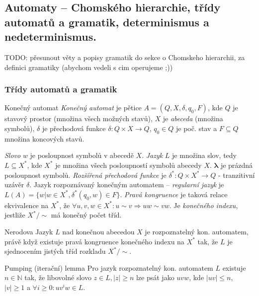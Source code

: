 \def\implies{\Rightarrow}
\def\Nat{\mathbb{N}}
\def\Real{\mathbb{R}}
\def\isimplied{\Leftarrow}
\def\onlyif{\Leftrightarrow}
\def\c#1{\mathcal{#1}}


\subsection{Automaty -- Chomského hierarchie, třídy automatů a gramatik, determinismus a nedeterminismus.}


TODO: přesunout věty a popisy gramatik do sekce o Chomskeho hierarchii, za definici gramatiky (abychom vedeli s cim operujeme ;))

\subsubsection*{Třídy automatů a gramatik}

\begin{definiceN}{Konečný automat}
\emph{Konečný automat} je pětice $A = (Q,X,\delta,q_0,F)$, kde $Q$ je stavový prostor (množina všech možných stavů), $X$ je \emph{abeceda} (množina symbolů), $\delta$ je přechodová funkce $\delta: Q\times X\to Q$, $q_0\in Q$ je poč. stav a $F\subseteq Q$ množina koncových stavů.
\end{definiceN}

\begin{definice}
\emph{Slovo} $w$ je posloupnost symbolů v abecedě $X$. \emph{Jazyk} $L$ je množina slov, tedy $L\subseteq X^{\ast}$, kde $X^{\ast}$ je množina všech posloupností symbolů abecedy $X$. $\mathbf{\lambda}$ je prázdná posloupnost symbolů. \emph{Rozšířená přechodová funkce} je $\delta^{\ast}:Q\times X^{\ast} \to Q$ - tranzitivní uzávěr $\delta$. Jazyk rozpoznávaný konečným automatem -- \emph{regularní jazyk} je $L(A) = \{ w | w\in X^{\ast}, \delta^{\ast}(q_0,w)\in F \}$. \emph{Pravá kongruence} je taková relace ekvivalence na $X^{\ast}$, že $\forall u,v,w\in X^{\ast}: u \sim v \implies uw \sim vw$. Je \emph{konečného indexu}, jestliže $X^{\ast}/\sim$ má konečný počet tříd.
\end{definice}

\begin{vetaN}{Nerodova}
Jazyk $L$ nad konečnou abecedou $X$ je rozpoznatelný kon. automatem, právě když existuje pravá kongruence konečného indexu na $X^{\ast}$ tak, že $L$ je sjednocením jistých tříd rozkladu $X^{\ast}/\sim$.
\end{vetaN}
\begin{vetaN}{Pumping (iterační) lemma}
Pro jazyk rozpoznatelný kon. automatem $L$ existuje $n\in \Nat$ tak, že libovolné slovo $z\in L,|z|\geq n$ lze psát jako $uvw$, kde $|uv|\leq n$, $|v|\geq 1$ a $\forall i\geq 0: uv^{i}w\in L$.
\end{vetaN}

